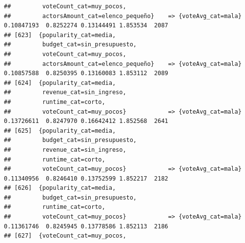 \documentclass[
]{article}
\begin{document}
\begin{verbatim}
##         voteCount_cat=muy_pocos,                                                                                                
##         actorsAmount_cat=elenco_pequeño}    => {voteAvg_cat=mala}                0.10847193  0.8252274 0.13144491 1.853534  2087
## [623]  {popularity_cat=media,                                                                                                   
##         budget_cat=sin_presupuesto,                                                                                             
##         voteCount_cat=muy_pocos,                                                                                                
##         actorsAmount_cat=elenco_pequeño}    => {voteAvg_cat=mala}                0.10857588  0.8250395 0.13160083 1.853112  2089
## [624]  {popularity_cat=media,                                                                                                   
##         revenue_cat=sin_ingreso,                                                                                                
##         runtime_cat=corto,                                                                                                      
##         voteCount_cat=muy_pocos}            => {voteAvg_cat=mala}                0.13726611  0.8247970 0.16642412 1.852568  2641
## [625]  {popularity_cat=media,                                                                                                   
##         budget_cat=sin_presupuesto,                                                                                             
##         revenue_cat=sin_ingreso,                                                                                                
##         runtime_cat=corto,                                                                                                      
##         voteCount_cat=muy_pocos}            => {voteAvg_cat=mala}                0.11340956  0.8246410 0.13752599 1.852217  2182
## [626]  {popularity_cat=media,                                                                                                   
##         budget_cat=sin_presupuesto,                                                                                             
##         runtime_cat=corto,                                                                                                      
##         voteCount_cat=muy_pocos}            => {voteAvg_cat=mala}                0.11361746  0.8245945 0.13778586 1.852113  2186
## [627]  {voteCount_cat=muy_pocos,                                                                                                

\end{verbatim}
\end{document}
